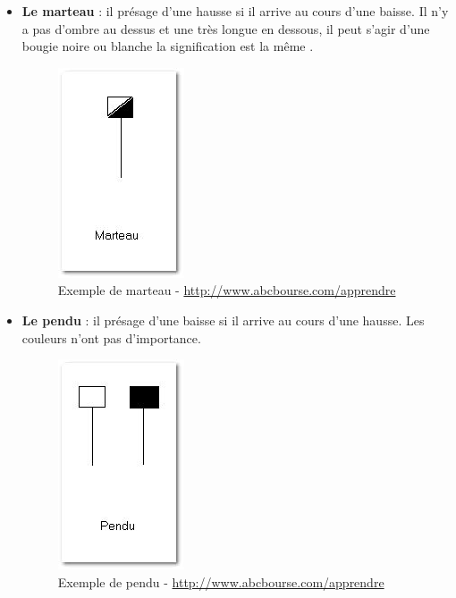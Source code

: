 \begin{itemize}
\item \textbf{Le marteau} : il présage d’une hausse si il arrive au cours d’une baisse. Il n’y a pas d’ombre au dessus et une très longue en dessous, il peut s’agir d’une bougie noire ou blanche la signification est la même .
\begin{figure}[H]
  \center
  \includegraphics[scale=0.5]{../graph/chandelier3.png}
  \caption{Exemple de marteau - \url{http://www.abcbourse.com/apprendre}}
\end{figure} 

\item \textbf{Le pendu} : il présage d’une baisse si il arrive au cours d’une hausse. Les couleurs n’ont pas d’importance. 
 \begin{figure}[H]
  \center
  \includegraphics[scale=0.5]{../graph/chandelier4.png}
  \caption{Exemple de pendu - \url{http://www.abcbourse.com/apprendre}}
\end{figure} 


\end{itemize}
